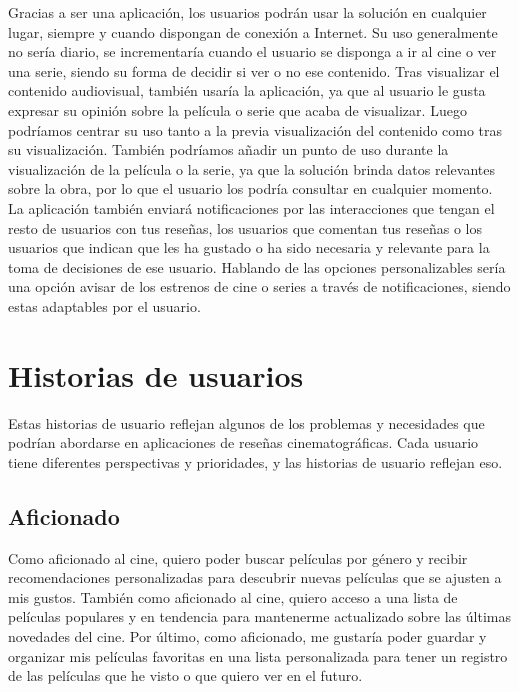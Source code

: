 Gracias a ser una aplicación, los usuarios podrán usar la solución en cualquier lugar, siempre y 
cuando dispongan de conexión a Internet. Su uso generalmente no sería diario, se incrementaría cuando 
el usuario se disponga a ir al cine o ver una serie, siendo su forma de decidir si ver o no ese 
contenido. Tras visualizar el contenido audiovisual, también usaría la aplicación, ya que al usuario le 
gusta expresar su opinión sobre la película o serie que acaba de visualizar. Luego podríamos centrar su 
uso tanto a la previa visualización del contenido como tras su visualización. También podríamos añadir 
un punto de uso durante la visualización de la película o la serie, ya que la solución brinda datos 
relevantes sobre la obra, por lo que el usuario los podría consultar en cualquier momento. La 
aplicación también enviará notificaciones por las interacciones que tengan el resto de usuarios con tus 
reseñas, los usuarios que comentan tus reseñas o los usuarios que indican que les ha gustado o ha sido 
necesaria y relevante para la toma de decisiones de ese usuario. Hablando de las opciones 
personalizables sería una opción avisar de los estrenos de cine o series a través de notificaciones, 
siendo estas adaptables por el usuario.


\section{Historias de usuarios}

Estas historias de usuario reflejan algunos de los problemas y necesidades que podrían abordarse en aplicaciones de reseñas cinematográficas. Cada usuario tiene diferentes perspectivas y prioridades, y las historias de usuario reflejan eso.

\subsection{Aficionado}

Como aficionado al cine, quiero  poder buscar películas por género y recibir recomendaciones personalizadas para descubrir nuevas películas que se ajusten a mis gustos. También como aficionado al cine, quiero acceso a una lista de películas populares y en tendencia para mantenerme actualizado sobre las últimas novedades del cine. Por último, como aficionado, me gustaría poder guardar y organizar mis películas favoritas en una lista personalizada para tener un registro de las películas que he visto o que quiero ver en el futuro.

